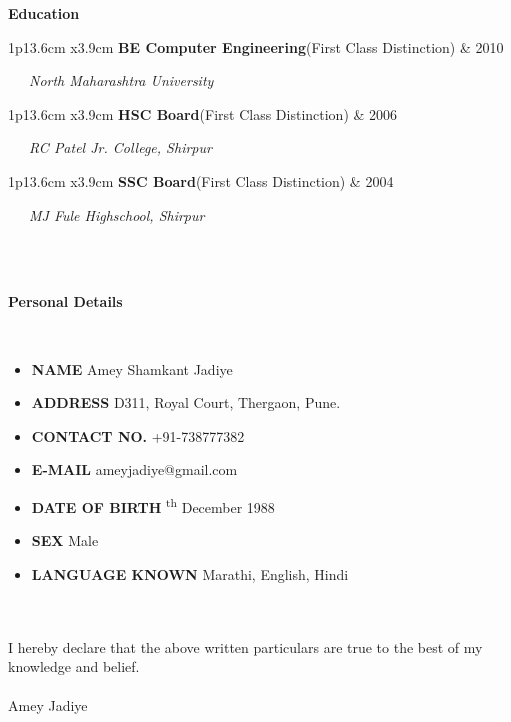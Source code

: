 \documentclass[10pt,A4]{article}
\newcommand{\cvsection}[1]
{
	\begin{center}
		\large\textcolor{sectcol}{\textbf{#1}}
	\end{center}
}
\newcommand{\cvedu}[3]
{

\begin{tabular*}{1\textwidth}{p{13.6cm}  x{3.9cm}}
	\textbf{#2}\tab \small{(First Class Distinction)} & \tab\textcolor{sectcol}{#1} 
\end{tabular*}

	\vspace{-1pt}
	\ \ \ \textcolor{bgcol}{\small{\textit{#3}}}
	\ \ \ \vspace{10pt}

}
\newcommand{\mystrut}{\rule[-.3\baselineskip]{0pt}{\baselineskip}}
\begin{document}
\cvsection{Education}

\cvedu{2010}{BE Computer Engineering}{North Maharashtra University}


%
\cvedu{2006}{HSC Board}{RC Patel Jr. College, Shirpur}


%
\cvedu{2004}{SSC Board}{MJ Fule Highschool, Shirpur}

\ \\ \\

\cvsection{Personal Details}

\ \\
\begin{itemize}

\item \textbf{NAME} \tab Amey Shamkant Jadiye
\item \textbf{ADDRESS} \tab D311, Royal Court, Thergaon, Pune.
\item \textbf{CONTACT NO.} \tab +91-738777382
\item \textbf{E-MAIL} \tab ameyjadiye@gmail.com
\item \textbf{DATE OF BIRTH} \textsuperscript{th} December 1988
\item \textbf{SEX} \tab Male
\item \textbf{LANGUAGE KNOWN} \tab Marathi, English, Hindi

\end{itemize}

\ \\ \\
I hereby declare that the above written particulars are true to the best of my
knowledge and belief.
\\ \\
Amey Jadiye




\null
\vspace*{\fill}
\hspace{-0.25\linewidth}\colorbox{white}{\makebox[1.5\linewidth][c]{\mystrut  \textnormal{\textcolor{sectcol}{}  \textcolor{sectcol}{github.com/ameyjadiye}}}}


%
%
%
%
%
%
\end{document}

